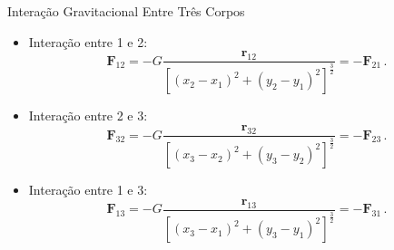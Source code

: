 \documentclass[compress]{beamer}
\begin{document}
\begin{frame}{Interação Gravitacional Entre Três Corpos}


\begin{itemize}
\vfill \item<+->{Interação entre 1 e 2:
\begin{equation*}
 \mathbf{F}_{12}=-G\frac{\mathbf{r}_{12}}{\left[\left(x_2-x_1\right)^2+\left(y_2-y_1\right)^2\right]^{\frac{3}{2}}}=-\mathbf{F}_{21} \, .
\end{equation*}
}

\vfill \item<+->{Interação entre 2 e 3:
\begin{equation*}
  \mathbf{F}_{32}=-G\frac{\mathbf{r}_{32}}{\left[\left(x_3-x_2\right)^2+\left(y_3-y_2\right)^2\right]^{\frac{3}{2}}}=-\mathbf{F}_{23} \, .
\end{equation*}
}

\vfill \item<+->{Interação entre 1 e 3:
\begin{equation*}
 \mathbf{F}_{13}=-G\frac{\mathbf{r}_{13}}{\left[\left(x_3-x_1\right)^2+\left(y_3-y_1\right)^2\right]^{\frac{3}{2}}}=-\mathbf{F}_{31} \, . 
\end{equation*}
}

\end{itemize}
\end{frame}
\end{document}
